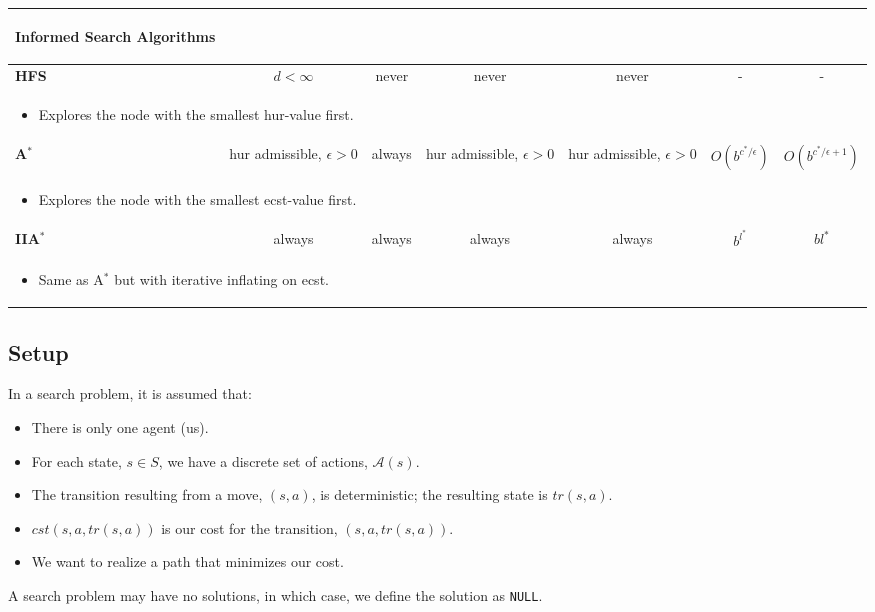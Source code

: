 \begin{summary}
\begin{center}
\begin{tabular}{lcccccc}
{\begin{center}
            \textbf{Informed Search Algorithms}
        \end{center}} \\
        \midrule
        \textbf{HFS} & $d<\infty$ & never & never & never & - & - \\
        \multicolumn{7}{p{\linewidth}}{
        \begin{itemize}
            \item Explores the node with the smallest hur-value first.
        \end{itemize}} \\
        \midrule
        \textbf{A$^*$} & hur admissible, $\epsilon > 0$ & always & hur admissible, $\epsilon > 0$ & hur admissible, $\epsilon > 0$ & $O\left(b^{c^{*}/\epsilon}\right)$ & $O\left(b^{c^{*}/\epsilon + 1}\right)$ \\
        \multicolumn{7}{p{\linewidth}}{
        \begin{itemize}
            \item Explores the node with the smallest ecst-value first.
        \end{itemize}} \\
        \midrule
        \textbf{IIA$^*$} & always & always & always & always & $b^{l^{*}}$ & $bl^{*} $ \\
        \multicolumn{7}{p{\linewidth}}{
        \begin{itemize}
            \item Same as A$^*$ but with iterative inflating on ecst.
        \end{itemize}} \\
        \bottomrule
        \end{tabular}
    \end{center}
\end{summary}

\subsection{Setup}
\begin{definition} In a search problem, it is assumed that: 
    \begin{itemize}
        \item There is only one agent (us).
        \item For each state, $s \in S$, we have a discrete set of actions, $\mathcal{A}(s)$.
        \item The transition resulting from a move, $(s, a)$, is deterministic; the resulting state is $tr(s, a)$.
        \item $cst(s, a, tr(s, a))$ is our cost for the transition, $(s, a, tr(s, a))$.
        \item We want to realize a path that minimizes our cost.
    \end{itemize}
    
    A search problem may have no solutions, in which case, we define the solution as \texttt{NULL}.
\end{definition}

